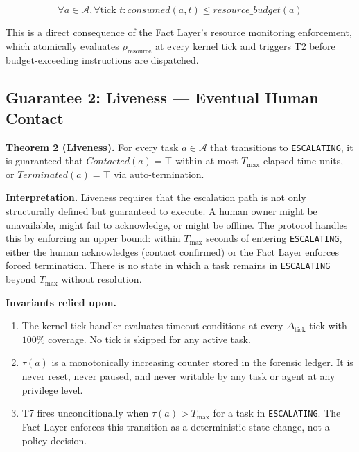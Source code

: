\[
\forall a \in \mathcal{A}, \forall \text{tick } t: consumed(a, t) \leq resource\_budget(a)
\]

This is a direct consequence of the Fact Layer's resource monitoring enforcement, which atomically evaluates $\rho_\text{resource}$ at every kernel tick and triggers T2 before budget-exceeding instructions are dispatched.

\subsection{Guarantee 2: Liveness — Eventual Human Contact}
\label{sec:liveness}

\textbf{Theorem 2 (Liveness).} For every task $a \in \mathcal{A}$ that transitions to \texttt{ESCALATING}, it is guaranteed that $Contacted(a) = \top$ within at most $T_\text{max}$ elapsed time units, or $Terminated(a) = \top$ via auto-termination.

\bigskip
\noindent\textbf{Interpretation.} Liveness requires that the escalation path is not only structurally defined but guaranteed to execute. A human owner might be unavailable, might fail to acknowledge, or might be offline. The protocol handles this by enforcing an upper bound: within $T_\text{max}$ seconds of entering \texttt{ESCALATING}, either the human acknowledges (contact confirmed) or the Fact Layer enforces forced termination. There is no state in which a task remains in \texttt{ESCALATING} beyond $T_\text{max}$ without resolution.

\bigskip
\noindent\textbf{Invariants relied upon.}

\begin{enumerate}
\item[\textbf{I5}] The kernel tick handler evaluates timeout conditions at every $\Delta_\text{tick}$ tick with $100\%$ coverage. No tick is skipped for any active task.
\item[\textbf{I6}] $\tau(a)$ is a monotonically increasing counter stored in the forensic ledger. It is never reset, never paused, and never writable by any task or agent at any privilege level.
\item[\textbf{I7}] T7 fires unconditionally when $\tau(a) > T_\text{max}$ for a task in \texttt{ESCALATING}. The Fact Layer enforces this transition as a deterministic state change, not a policy decision.
\end{enumerate}

